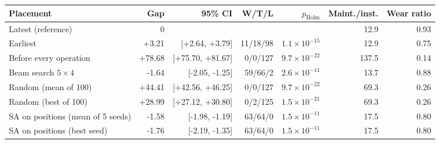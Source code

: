 \begin{tabular}{lrrrrrr}
\toprule
Placement & Gap & 95\% CI & W/T/L & $p_{\mathrm{Holm}}$ & Maint./inst. & Wear ratio \\
\midrule
Latest (reference) & 0 & & & & 12.9 & 0.93 \\
Earliest & +3.21 & [+2.64, +3.79] & 11/18/98 & $1.1 \times 10^{-15}$ & 12.9 & 0.75 \\
Before every operation & +78.68 & [+75.70, +81.67] & 0/0/127 & $9.7 \times 10^{-22}$ & 137.5 & 0.14 \\
Beam search $5 \times 4$ & -1.64 & [-2.05, -1.25] & 59/66/2 & $2.6 \times 10^{-11}$ & 13.7 & 0.88 \\
Random (mean of 100) & +44.41 & [+42.56, +46.25] & 0/0/127 & $9.7 \times 10^{-22}$ & 69.3 & 0.26 \\
Random (best of 100) & +28.99 & [+27.12, +30.80] & 0/2/125 & $1.5 \times 10^{-21}$ & 69.3 & 0.26 \\
SA on positions (mean of 5 seeds) & -1.58 & [-1.98, -1.19] & 63/64/0 & $1.5 \times 10^{-11}$ & 17.5 & 0.80 \\
SA on positions (best seed) & -1.76 & [-2.19, -1.35] & 63/64/0 & $1.5 \times 10^{-11}$ & 17.5 & 0.80 \\
\bottomrule
\end{tabular}
